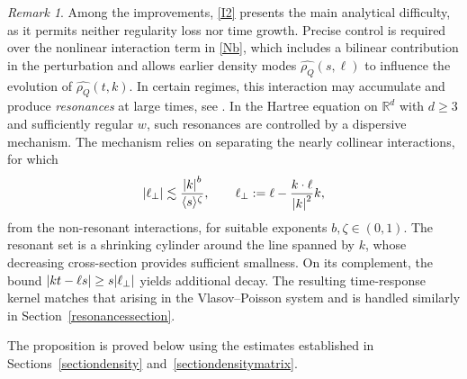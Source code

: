 \documentclass[JEP,XML,SOM,Unicode]{cedram}
\theoremstyle{plain}
\theoremstyle{remark}
\newtheorem{remark}[theorem]{Remark}
\newcommand{\ak}{\abs{k}}
\newcommand{\jb}[1]{\langle#1\rangle}
\newcommand{\R}{\mathbb{R}}
\begin{document}
\begin{remark}
Among the improvements, \eqref{I2} presents the main analytical difficulty, as it permits neither regularity loss nor time growth. Precise control is required over the nonlinear interaction term in \eqref{Nb}, which includes a bilinear contribution in the perturbation and allows earlier density modes $\widehat{\rho_Q}(s,\ell)$ to influence the evolution of $\widehat{\rho_Q}(t,k)$. In certain regimes, this interaction may accumulate and produce \textit{resonances} at large times, see \eg \cite{Bedrossian2021Echoes}. In the Hartree equation on $\R^d$ with $d\geq 3$ and sufficiently regular $w$, such resonances are controlled by a dispersive mechanism. The mechanism relies on separating the nearly collinear interactions, for which
\begin{align*}
\abs{\ell_\perp}\lesssim\frac{\ak^{b}}{\jb{s}^{\zeta}},\qquad \ell_\perp:=\ell-\frac{k\cdot\ell}{\ak^2}k,
\end{align*}
from the non-resonant interactions, for suitable exponents $b,\zeta\in(0,1)$. The resonant set is a shrinking cylinder around the line spanned by $k$, whose decreasing cross-section provides sufficient smallness. On its complement, the bound $\abs{kt-\ell s}\geq s\abs{\ell_\perp}$ yields additional decay. The resulting time-response kernel matches that arising in the Vlasov--Poisson system and is handled similarly in Section~\ref{resonancessection}.
\end{remark}

The proposition is proved below using the estimates established in Sections~\ref{sectiondensity} and~\ref{sectiondensitymatrix}.
\end{document}

